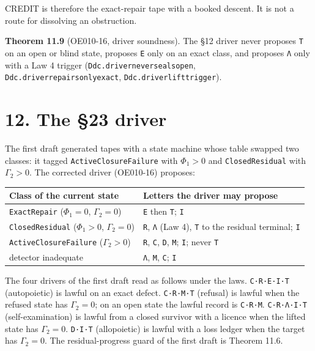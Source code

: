 \documentclass[
  11pt,
]{article}
\renewcommand{\_}{\ddcunderscore\allowbreak}
\begin{document}
CREDIT is therefore the exact-repair tape with a booked descent. It is
not a route for dissolving an obstruction.

\textbf{Theorem 11.9} (OE010-16, driver soundness). The §12 driver never
proposes \texttt{T} on an open or blind state, proposes \texttt{E} only
on an exact class, and proposes \texttt{Λ} only with a Law 4 trigger
(\texttt{Ddc.\allowbreak driver\_never\_seals\_open},
\texttt{Ddc.\allowbreak driver\_repairs\_only\_exact},
\texttt{Ddc.\allowbreak driver\_lift\_trigger}).

\section{12. The §23 driver}\label{the-23-driver}

The first draft generated tapes with a state machine whose table swapped
two classes: it tagged \texttt{Active\allowbreak Closure\allowbreak Failure} with \(\Phi_1 > 0\)
and \texttt{Closed\allowbreak Residual} with \(\Gamma_2 > 0\). The corrected driver
(OE010-16) proposes:

\begin{longtable}[]{@{}
  >{\raggedright\arraybackslash}p{}
  >{\raggedright\arraybackslash}p{}@{}}
\toprule\noalign{}
\begin{minipage}[b]{\linewidth}\raggedright
Class of the current state
\end{minipage} & \begin{minipage}[b]{\linewidth}\raggedright
Letters the driver may propose
\end{minipage} \\
\midrule\noalign{}
\endhead
\bottomrule\noalign{}
\endlastfoot
\texttt{Exact\allowbreak Repair} (\(\Phi_1 = 0\), \(\Gamma_2 = 0\)) & \texttt{E}
then \texttt{T}; \texttt{I} \\
\texttt{Closed\allowbreak Residual} (\(\Phi_1 > 0\), \(\Gamma_2 = 0\)) & \texttt{R},
\texttt{Λ} (Law 4), \texttt{T} to the residual terminal; \texttt{I} \\
\texttt{Active\allowbreak Closure\allowbreak Failure} (\(\Gamma_2 > 0\)) & \texttt{R},
\texttt{C}, \texttt{D}, \texttt{M}; \texttt{I}; never \texttt{T} \\
detector inadequate & \texttt{Λ}, \texttt{M}, \texttt{C}; \texttt{I} \\
\end{longtable}

The four drivers of the first draft read as follows under the laws.
\texttt{C·R·E·I·T} (autopoietic) is lawful on an exact defect.
\texttt{C·R·M·T} (refusal) is lawful when the refused state has
\(\Gamma_2 = 0\); on an open state the lawful record is \texttt{C·R·M}.
\texttt{C·R·Λ·I·T} (self-examination) is lawful from a closed survivor
with a licence when the lifted state has \(\Gamma_2 = 0\).
\texttt{D·I·T} (allopoietic) is lawful with a loss ledger when the
target has \(\Gamma_2 = 0\). The residual-progress guard of the first
draft is Theorem 11.6.
\end{document}

